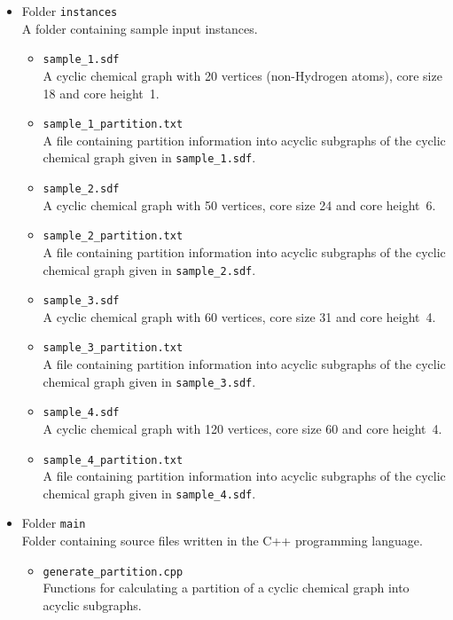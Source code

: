\documentclass[11pt,titlepage,dvipdfmx,twoside]{book}
\begin{document}
{\begin{itemize}
\begin{itemize}
	\item Folder {\tt instances}\\
		A folder containing sample input instances.
		\begin{itemize}
			\item{\tt sample\_1.sdf}\\
			  A cyclic chemical graph with 20 vertices (non-Hydrogen atoms),
			    core size 18 and core height~1.
			\item{\tt sample\_1\_partition.txt}\\
			  A file containing partition information into acyclic subgraphs 
				of the cyclic chemical graph given in {\tt sample\_1.sdf}.
			\item{\tt sample\_2.sdf}\\
			  A cyclic chemical graph with 50 vertices, 
			    core size 24 and core height~6.
			\item{\tt sample\_2\_partition.txt}\\
			  A file containing partition information into acyclic subgraphs 
				of the cyclic chemical graph given in {\tt sample\_2.sdf}.
			\item{\tt sample\_3.sdf}\\
			  A cyclic chemical graph with 60 vertices, 
			    core size 31 and core height~4.
			\item{\tt sample\_3\_partition.txt}\\
			  A file containing partition information into acyclic subgraphs 
				of the cyclic chemical graph given in {\tt sample\_3.sdf}.
			\item{\tt sample\_4.sdf}\\
			  A cyclic chemical graph with 120 vertices, 
			    core size 60 and core height~4.
			\item{\tt sample\_4\_partition.txt}\\
			  A file containing partition information into acyclic subgraphs 
				of the cyclic chemical graph given in {\tt sample\_4.sdf}.
		\end{itemize}
    \item Folder {\tt main}\\
	    Folder containing source files written in the C++ programming language.
	    \begin{itemize}
		    \item{ \tt generate\_partition.cpp}\\
			    Functions for calculating a partition of a cyclic chemical graph into
			    acyclic subgraphs.
			    

\end{itemize}
\end{itemize}
\end{itemize}}
\end{document}
